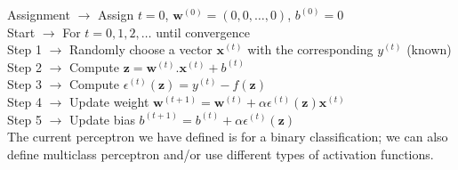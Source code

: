 \vspace{5mm}
\noindent Assignment $\rightarrow$ Assign $t=0$, $\textbf{w}^{(0)} = (0,0,\dots,0)$, $b^{(0)}=0$\\
Start $\rightarrow$ For $t=0,1,2,\dots$ until convergence\\
\indent Step 1 $\rightarrow$ Randomly choose a vector $\textbf{x}^{(t)}$ with the corresponding $y^{(t)}$ (known)\\
\indent Step 2 $\rightarrow$ Compute $\textbf{z}=\textbf{w}^{(t)}.\textbf{x}^{(t)} + b^{(t)}$\\
\indent Step 3 $\rightarrow$ Compute $\epsilon^{(t)}(\textbf{z}) = y^{(t)} - f(\textbf{z}) $\\
\indent Step 4 $\rightarrow$ Update weight $\textbf{w}^{(t+1)} = \textbf{w}^{(t)} + \alpha\epsilon^{(t)}(\textbf{z})\textbf{x}^{(t)}$ \\
\indent Step 5 $\rightarrow$ Update bias  $b^{(t+1)} = b^{(t)} + \alpha\epsilon^{(t)}(\textbf{z})$
\vspace{10mm}
\\
The current perceptron we have defined is for a binary classification; we can also define multiclass perceptron and/or use different types of activation functions.
